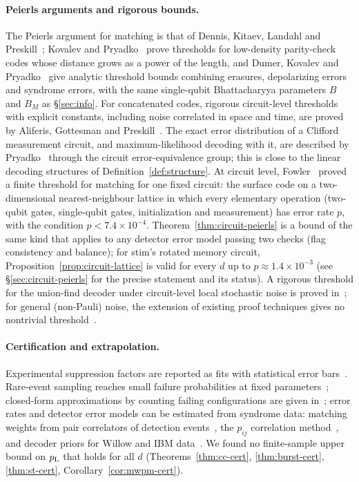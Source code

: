 \paragraph{Peierls arguments and rigorous bounds.}
The Peierls argument for matching is that of Dennis, Kitaev, Landahl and Preskill~\cite{DKLP}; Kovalev and Pryadko~\cite{KovalevPryadko} prove thresholds for low-density parity-check codes whose distance grows as a power of the length, and Dumer, Kovalev and Pryadko~\cite{DKP} give analytic threshold bounds combining erasures, depolarizing errors and syndrome errors, with the same single-qubit Bhattacharyya parameters $B$ and $B_M$ as \S\ref{sec:info}. For concatenated codes, rigorous circuit-level thresholds with explicit constants, including noise correlated in space and time, are proved by Aliferis, Gottesman and Preskill~\cite{AGP}. The exact error distribution of a Clifford measurement circuit, and maximum-likelihood decoding with it, are described by Pryadko~\cite{Pryadko} through the circuit error-equivalence group; this is close to the linear decoding structures of Definition~\ref{def:structure}. At circuit level, Fowler~\cite{Fowler} proved a finite threshold for matching for one fixed circuit: the surface code on a two-dimensional nearest-neighbour lattice in which every elementary operation (two-qubit gates, single-qubit gates, initialization and measurement) has error rate $p$, with the condition $p<7.4\times10^{-4}$. Theorem~\ref{thm:circuit-peierls} is a bound of the same kind that applies to any detector error model passing two checks (flag consistency and balance); for stim's rotated memory circuit, Proposition~\ref{prop:circuit-lattice} is valid for every $d$ up to $p\approx1.4\times10^{-3}$ (see \S\ref{sec:circuit-peierls} for the precise statement and its status). A rigorous threshold for the union-find decoder under circuit-level local stochastic noise is proved in~\cite{YLY}; for general (non-Pauli) noise, the extension of existing proof techniques gives no nontrivial threshold~\cite{ChaiNg}.

\paragraph{Certification and extrapolation.}
Experimental suppression factors are reported as fits with statistical error bars~\cite{Google22,Google24}. Rare-event sampling reaches small failure probabilities at fixed parameters~\cite{BV,Mayer}; closed-form approximations by counting failing configurations are given in~\cite{Regev}; error rates and detector error models can be estimated from syndrome data: matching weights from pair correlators of detection events~\cite{Spitz}, the $p_{ij}$ correlation method~\cite{Google21}, and decoder priors for Willow and IBM data~\cite{Takou}. We found no finite-sample upper bound on $p_{\mathrm{L}}$ that holds for all $d$ (Theorems~\ref{thm:cc-cert}, \ref{thm:burst-cert}, \ref{thm:st-cert}, Corollary~\ref{cor:mwpm-cert}).

